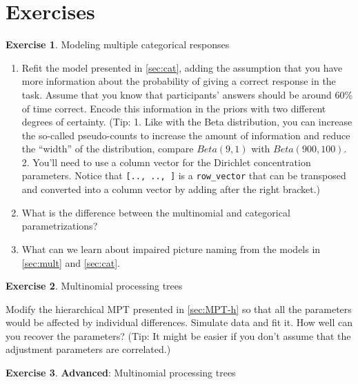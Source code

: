 \documentclass[12pt,]{krantz}
\providecommand{\tightlist}{%
  \setlength{\itemsep}{0pt}\setlength{\parskip}{0pt}}
\theoremstyle{definition}
\theoremstyle{definition}
\theoremstyle{definition}
\newtheorem{exercise}{Exercise}[chapter]
\theoremstyle{remark}
\begin{document}
\hypertarget{exercises-9}{%
\section{Exercises}\label{exercises-9}}

\begin{exercise}
\protect\hypertarget{exr:mult}{}{\label{exr:mult} }Modeling multiple categorical responses
\end{exercise}

\begin{enumerate}
\def\labelenumi{\alph{enumi}.}
\tightlist
\item
  Refit the model presented in \ref{sec:cat}, adding the assumption that you have more information about the probability of giving a correct response in the task. Assume that you know that participants' answers should be around 60\% of time correct. Encode this information in the priors with two different degrees of certainty. (Tip: 1. Like with the Beta distribution, you can increase the so-called pseudo-counts to increase the amount of information and reduce the ``width'' of the distribution, compare \(Beta(9,1)\) with \(Beta(900,100)\). 2. You'll need to use a column vector for the Dirichlet concentration parameters. Notice that \texttt{{[}..,\ ..,\ {]}} is a \texttt{row\_vector} that can be transposed and converted into a column vector by adding \texttt{\textquotesingle{}} after the right bracket.)
\item
  What is the difference between the multinomial and categorical parametrizations?
\item
  What can we learn about impaired picture naming from the models in \ref{sec:mult} and \ref{sec:cat}.
\end{enumerate}

\begin{exercise}
\protect\hypertarget{exr:mpt}{}{\label{exr:mpt} }Multinomial processing trees
\end{exercise}

Modify the hierarchical MPT presented in \ref{sec:MPT-h} so that all the parameters would be affected by individual differences. Simulate data and fit it. How well can you recover the parameters? (Tip: It might be easier if you don't assume that the adjustment parameters are correlated.)

\begin{exercise}
\protect\hypertarget{exr:mpt-adv}{}{\label{exr:mpt-adv} }\textbf{Advanced}: Multinomial processing trees
\end{exercise}
\end{document}
